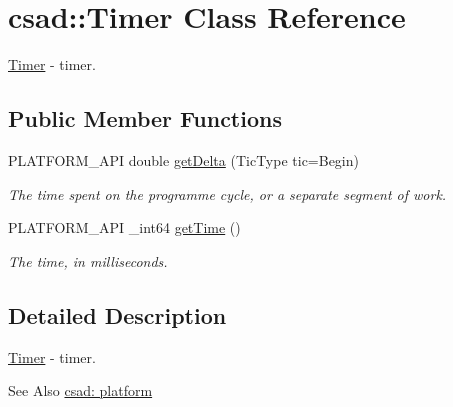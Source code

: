 \hypertarget{classcsad_1_1_timer}{\section{csad\-:\-:Timer Class Reference}
\label{classcsad_1_1_timer}
}


\hyperlink{classcsad_1_1_timer}{Timer} -\/ timer.  


\subsection*{Public Member Functions}
\begin{DoxyCompactItemize}
\item 
\hypertarget{classcsad_1_1_timer_ad99e0abed99e6c5da190c393ccf67931}{P\-L\-A\-T\-F\-O\-R\-M\-\_\-\-A\-P\-I double \hyperlink{classcsad_1_1_timer_ad99e0abed99e6c5da190c393ccf67931}{get\-Delta} (Tic\-Type tic=Begin)}\label{classcsad_1_1_timer_ad99e0abed99e6c5da190c393ccf67931}

\begin{DoxyCompactList}\small\item\em The time spent on the programme cycle, or a separate segment of work. \end{DoxyCompactList}\item 
\hypertarget{classcsad_1_1_timer_acb095a3f2779624d3f71529eda8bdbb7}{P\-L\-A\-T\-F\-O\-R\-M\-\_\-\-A\-P\-I \-\_\-int64 \hyperlink{classcsad_1_1_timer_acb095a3f2779624d3f71529eda8bdbb7}{get\-Time} ()}\label{classcsad_1_1_timer_acb095a3f2779624d3f71529eda8bdbb7}

\begin{DoxyCompactList}\small\item\em The time, in milliseconds. \end{DoxyCompactList}\end{DoxyCompactItemize}


\subsection{Detailed Description}
\hyperlink{classcsad_1_1_timer}{Timer} -\/ timer. 

\begin{DoxySeeAlso}{See Also}
\hyperlink{group__platform}{csad\-: platform} 
\end{DoxySeeAlso}
